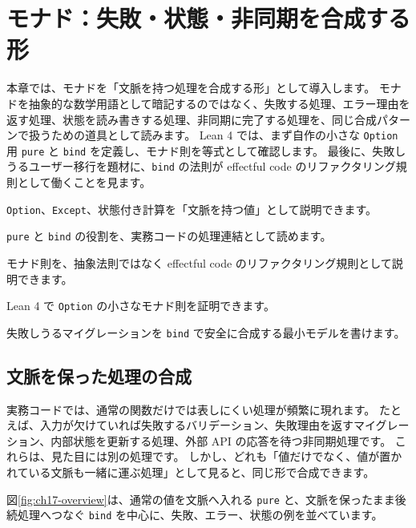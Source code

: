 \chapter{モナド：失敗・状態・非同期を合成する形}
\label{chap:monad}

\begin{chapterabstract}
本章では、モナドを「文脈を持つ処理を合成する形」として導入します。
モナドを抽象的な数学用語として暗記するのではなく、失敗する処理、エラー理由を返す処理、状態を読み書きする処理、非同期に完了する処理を、同じ合成パターンで扱うための道具として読みます。
Lean 4 では、まず自作の小さな \texttt{Option} 用 \texttt{pure} と \texttt{bind} を定義し、モナド則を等式として確認します。
最後に、失敗しうるユーザー移行を題材に、\texttt{bind} の法則が effectful code のリファクタリング規則として働くことを見ます。
\end{chapterabstract}

\begin{learninggoals}
\item \texttt{Option}、\texttt{Except}、状態付き計算を「文脈を持つ値」として説明できます。
\item \texttt{pure} と \texttt{bind} の役割を、実務コードの処理連結として読めます。
\item モナド則を、抽象法則ではなく effectful code のリファクタリング規則として説明できます。
\item Lean 4 で \texttt{Option} の小さなモナド則を証明できます。
\item 失敗しうるマイグレーションを \texttt{bind} で安全に合成する最小モデルを書けます。
\end{learninggoals}

\section{文脈を保った処理の合成}

実務コードでは、通常の関数だけでは表しにくい処理が頻繁に現れます。
たとえば、入力が欠けていれば失敗するバリデーション、失敗理由を返すマイグレーション、内部状態を更新する処理、外部 API の応答を待つ非同期処理です。
これらは、見た目には別の処理です。
しかし、どれも「値だけでなく、値が置かれている文脈も一緒に運ぶ処理」として見ると、同じ形で合成できます。

図\ref{fig:ch17-overview}は、通常の値を文脈へ入れる \texttt{pure} と、文脈を保ったまま後続処理へつなぐ \texttt{bind} を中心に、失敗、エラー、状態の例を並べています。

